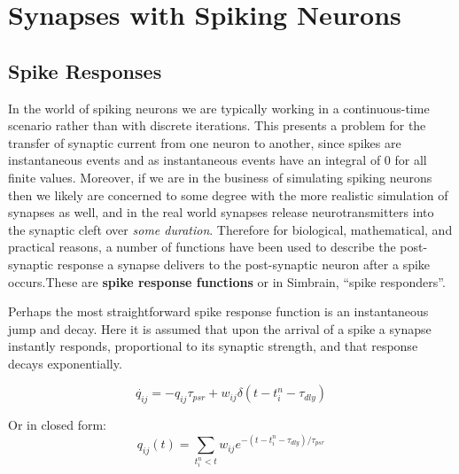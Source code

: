 \section{Synapses with Spiking Neurons}


\subsection{Spike Responses}

In the world of spiking neurons we are typically working in a continuous-time scenario rather than with discrete iterations. This presents a problem for the transfer of synaptic current from one neuron to another, since spikes are instantaneous events and as instantaneous events have an integral of $0$ for all finite values. Moreover, if we are in the business of simulating spiking neurons then we likely are concerned to some degree with the more realistic simulation of synapses as well, and in the real world synapses release neurotransmitters into the synaptic cleft over \emph{some duration}. Therefore for biological, mathematical, and practical reasons, a number of functions have been used to describe the post-synaptic response a synapse delivers to the post-synaptic neuron after a spike occurs.These are \textbf{spike response functions} or in Simbrain, ``spike responders''.

Perhaps the most straightforward spike response function is an instantaneous jump and decay. Here it is assumed that upon the arrival of a spike a synapse instantly responds, proportional to its synaptic strength, and that response decays exponentially.

\begin{equation*}
\dot{q_{ij}} = -q_{ij} \tau_{psr} + w_{ij}\delta(t-t^n_i - \tau_{dly})
\end{equation*}

Or in closed form:
\begin{equation*}
q_{ij}(t) = \sum_{t^n_i < t} w_{ij}e^{-(t-t^n_i-\tau_{dly})/\tau_{psr}}
\end{equation*}

